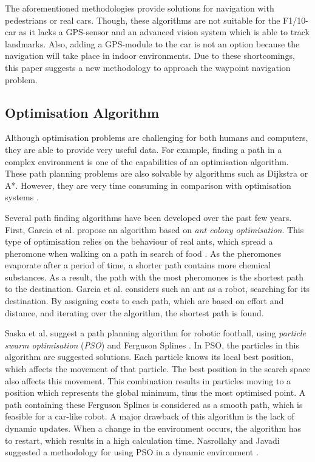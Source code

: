 \documentclass[conference,a4paper]{IEEEtran}
\begin{document}
The aforementioned methodologies provide solutions for navigation with pedestrians or real cars. Though, these algorithms are not suitable for the F1/10-car as it lacks a GPS-sensor and an advanced vision system which is able to track landmarks. Also, adding a GPS-module to the car is not an option because the navigation will take place in indoor environments. Due to these shortcomings, this paper suggests a new methodology to approach the waypoint navigation problem. 

\subsection{Optimisation Algorithm}
Although optimisation problems are challenging for both humans and computers, they are able to provide very useful data. 
For example, finding a path in a complex environment is one of the capabilities of an optimisation algorithm. These path planning problems are also solvable by algorithms such as Dijkstra or A*. However, they are very time consuming in comparison with optimisation systems \cite{Dang2014}.

Several path finding algorithms have been developed over the past few years. First, Garcia et al. propose an algorithm based on \emph{ant colony optimisation}\cite{Garcia2009}. This type of optimisation relies on the behaviour of real ants, which spread a pheromone when walking on a path in search of food \cite{Dorigo2006}. As the pheromones evaporate after a period of time, a shorter path contains more chemical substances. As a result, the path with the most pheromones is the shortest path to the destination. Garcia et al. considers such an ant as a robot, searching for its destination. By assigning costs to each path, which are based on effort and distance, and iterating over the algorithm, the shortest path is found.

Saska et al. suggest a path planning algorithm for robotic football, using \emph{particle swarm optimisation} (\emph{PSO}) and Ferguson Splines \cite{Saska2006}. In PSO, the particles in this algorithm are suggested solutions. Each particle knows its local best position, which affects the movement of that particle. The best position in the search space also affects this movement. This combination results in particles moving to a position which represents the global minimum, thus the most optimised point. A path containing these Ferguson Splines is considered as a smooth path, which is feasible for a car-like robot. A major drawback of this algorithm is the lack of dynamic updates. When a change in the environment occurs, the algorithm has to restart, which results in a high calculation time. Nasrollahy and Javadi suggested a methodology for using PSO in a dynamic environment \cite{Nasrollahy2009}. 
\end{document}

